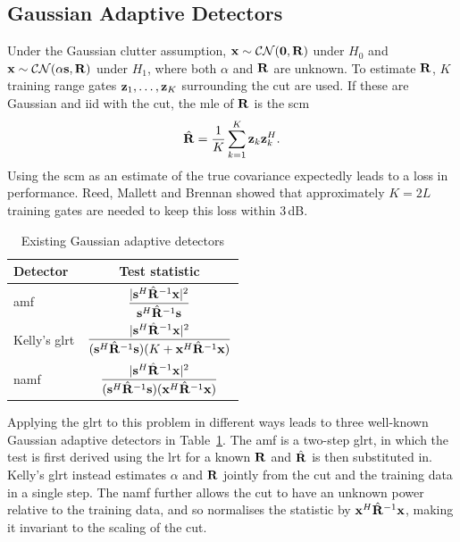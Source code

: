 \documentclass[12pt, a4paper]{report}
\begin{document}
\subsection{Gaussian Adaptive Detectors}
\label{sec:gaussian_detectors}
Under the Gaussian clutter assumption, $\vb x\sim\mathcal{CN}(\vb 0,\mathbf{R})$ under $H_0$ and $\vb x\sim\mathcal{CN}(\alpha\vb s,\mathbf{R})$ under $H_1$, where both $\alpha$ and $\mathbf{R}$ are unknown. To estimate $\mathbf{R}$, $K$ training range gates $\vb z_1,\dots,\vb z_K$ surrounding the \gls{cut} are used. If these are Gaussian and \gls{iid} with the \gls{cut}, the \gls{mle} of $\mathbf{R}$ is the \gls{scm}
\begin{equation}
    \hat{\mathbf{R}} = \frac{1}{K}\sum_{k=1}^{K}\vb z_k\vb z_k^H.
    \label{eq:scm}
\end{equation}
Using the \gls{scm} as an estimate of the true covariance expectedly leads to a loss in performance. Reed, Mallett and Brennan \cite{Reed1974} showed that approximately $K=2L$ training gates are needed to keep this loss within 3\,dB.\\

\vspace{5mm}
\begin{table}[htbp]
    \centering
    \caption{Existing Gaussian adaptive detectors}
    \label{tab:gaussian_detectors}
    \renewcommand{\arraystretch}{2.2}
    \begin{tabular}{@{}l c@{}}
        \hline
        Detector & Test statistic \\
        \hline
        \gls{amf} \cite{Chen1991} & $\dfrac{|\vb s^H\hat{\mathbf{R}}^{-1}\vb x|^2}{\vb s^H\hat{\mathbf{R}}^{-1}\vb s}$ \\
        Kelly's \gls{glrt} \cite{Kelly1986} & $\dfrac{|\vb s^H\hat{\mathbf{R}}^{-1}\vb x|^2}{(\vb s^H\hat{\mathbf{R}}^{-1}\vb s)(K+\vb x^H\hat{\mathbf{R}}^{-1}\vb x)}$ \\
        \gls{namf} \cite{Kraut1999} & $\dfrac{|\vb s^H\hat{\mathbf{R}}^{-1}\vb x|^2}{(\vb s^H\hat{\mathbf{R}}^{-1}\vb s)(\vb x^H\hat{\mathbf{R}}^{-1}\vb x)}$ \\
        \hline
    \end{tabular}
\end{table}
\vspace{5mm}

Applying the \gls{glrt} to this problem in different ways leads to three well-known Gaussian adaptive detectors in Table~\ref{tab:gaussian_detectors}. The \gls{amf} \cite{Chen1991} is a two-step \gls{glrt}, in which the test is first derived using the \gls{lrt} for a known $\mathbf{R}$ and $\hat{\mathbf{R}}$ is then substituted in. Kelly's \gls{glrt} \cite{Kelly1986} instead estimates $\alpha$ and $\mathbf{R}$ jointly from the \gls{cut} and the training data in a single step. The \gls{namf} \cite{Kraut1999} further allows the \gls{cut} to have an unknown power relative to the training data, and so normalises the statistic by $\vb x^H\hat{\mathbf{R}}^{-1}\vb x$, making it invariant to the scaling of the \gls{cut}.\\
\end{document}
